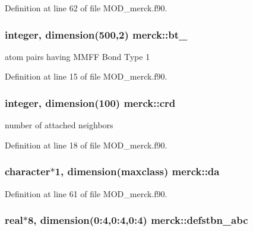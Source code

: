 Definition at line 62 of file M\-O\-D\-\_\-merck.\-f90.

\hypertarget{classmerck_a7aa21a7d8bb06595bc78236550c401c8}{
\subsubsection[{bt\-\_\-1}]{\setlength{\rightskip}{0pt plus 5cm}integer, dimension(500,2) merck\-::bt\-\_}}\label{classmerck_a7aa21a7d8bb06595bc78236550c401c8}


atom pairs having M\-M\-F\-F Bond Type 1 



Definition at line 15 of file M\-O\-D\-\_\-merck.\-f90.

\hypertarget{classmerck_ad5b47a826f521beb8f04587afe2368da}{
\subsubsection[{crd}]{\setlength{\rightskip}{0pt plus 5cm}integer, dimension(100) merck\-::crd}}\label{classmerck_ad5b47a826f521beb8f04587afe2368da}


number of attached neighbors 



Definition at line 18 of file M\-O\-D\-\_\-merck.\-f90.

\hypertarget{classmerck_a73afea490eec3b3fb2a36dd86a533d4a}{
\subsubsection[{da}]{\setlength{\rightskip}{0pt plus 5cm}character$\ast$1, dimension(maxclass) merck\-::da}}\label{classmerck_a73afea490eec3b3fb2a36dd86a533d4a}


Definition at line 61 of file M\-O\-D\-\_\-merck.\-f90.

\hypertarget{classmerck_a1c4ad28622b856dd11f51ffe05e6c324}{
\subsubsection[{defstbn\-\_\-abc}]{\setlength{\rightskip}{0pt plus 5cm}real$\ast$8, dimension(0\-:4,0\-:4,0\-:4) merck\-::defstbn\-\_\-abc}}\label{classmerck_a1c4ad28622b856dd11f51ffe05e6c324}


